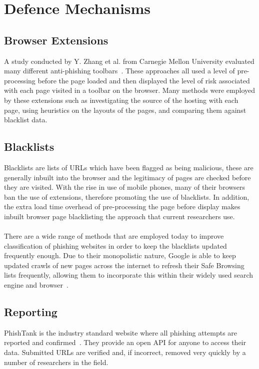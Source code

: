 \documentclass[12pt,twoside]{report}
\begin{document}
\section{Defence Mechanisms}
\subsection{Browser Extensions}
A study conducted by Y. Zhang et al. from Carnegie Mellon University evaluated many different anti-phishing toolbars~\cite{phindingphish}. These approaches all used a level of pre-processing before the page loaded and then displayed the level of risk associated with each page visited in a toolbar on the browser. Many methods were employed by these extensions such as investigating the source of the hosting with each page, using heuristics on the layouts of the pages, and comparing them against blacklist data.
\subsection{Blacklists}
Blacklists are lists of URLs which have been flagged as being malicious, these are generally inbuilt into the browser and the legitimacy of pages are checked before they are visited. With the rise in use of mobile phones, many of their browsers ban the use of extensions, therefore promoting the use of blacklists. In addition, the extra load time overhead of pre-processing the page before display makes inbuilt browser page blacklisting the approach that current researchers use.
\\\\
There are a wide range of methods that are employed today to improve classification of phishing websites in order to keep the blacklists updated frequently enough. Due to their monopolistic nature, Google is able to keep updated crawls of new pages across the internet to refresh their Safe Browsing lists frequently, allowing them to incorporate this within their widely used search engine and browser~\cite{safebrowsing}.
\subsection{Reporting}
PhishTank is the industry standard website where all phishing attempts are reported and confirmed~\cite{phishtank}. They provide an open API for anyone to access their data. Submitted URLs are verified and, if incorrect, removed very quickly by a number of researchers in the field.
\end{document}
